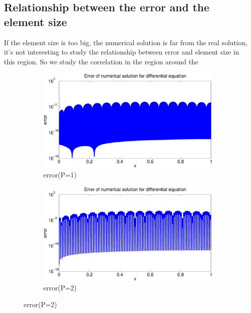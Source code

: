 \documentclass[paper=a4, fontsize=11pt]{article} %
\begin{document}
\subsection{Relationship between the error and the element size}
If the element size is too big, the numerical solution is far from the real solution, it's not interesting to study the relationship between error and element size in this region. So we study the correlation in the region around the 
\begin{figure}
        \centering
        \begin{subfigure}[b]{0.8\textwidth}
                \includegraphics[width=\textwidth]{error_P1.eps}
                \caption{error(P=1)}
                \label{fig:e1}
        \end{subfigure}%

        \begin{subfigure}[b]{0.8\textwidth}
                \includegraphics[width=\textwidth]{error_P2.eps}
                \caption{error(P=2)}
                \label{fig:e2}
        \end{subfigure}
        

\end{figure}
\end{document}
